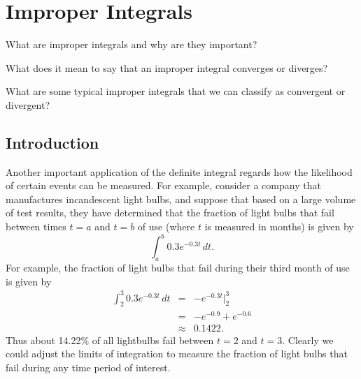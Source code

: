 \section{Improper Integrals} \label{S:5.5.Improper}

\begin{goals}
  \item What are improper integrals and why are they important?
  \item What does it mean to say that an improper integral converges or diverges?
  \item What are some typical improper integrals that we can classify as convergent or divergent? 
\end{goals}

\subsection*{Introduction}

Another important application of the definite integral 
regards how the likelihood of certain events can be measured.  For example, consider a company that manufactures incandescent light bulbs, and suppose that based on a large volume of test results, they have determined that the fraction of light bulbs that fail between times $t = a$ and $t = b$ of use (where $t$ is measured in months) is given by 
$$\int_a^b 0.3 e^{-0.3t} \, dt.$$
For example, the fraction of light bulbs that fail during their third month of use is given by
\begin{eqnarray*} 
\int_2^3 0.3e^{-0.3t} \, dt & = & -e^{-0.3t} \bigg \vert_2^3 \\
				& = & -e^{-0.9} + e^{-0.6} \\
				& \approx & 0.1422.
\end{eqnarray*}
Thus about 14.22\% of all lightbulbs fail between $t = 2$ and $t = 3$.  %
Clearly we could adjust the limits of integration to measure the fraction of light bulbs that fail during any time period of interest.


